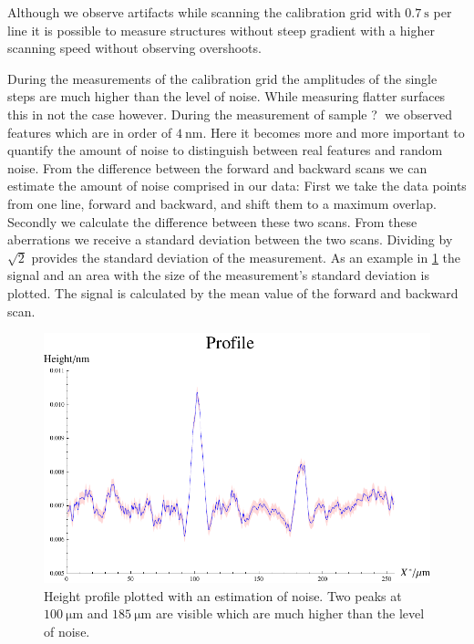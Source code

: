 \documentclass[paper=a4,fontsize=10pt,DIV=18,twocolumn,parskip=half]{scrartcl}
\numberwithin{equation}{section}    %
\begin{document}
Although we observe artifacts while scanning the calibration grid with  $\SI{0.7}{\second}$ per line it is possible to measure structures without steep gradient with a higher scanning speed without observing overshoots.

During the measurements of the calibration grid the amplitudes of the single steps are much higher than the level of noise. While measuring flatter surfaces this in not the case however. During the measurement of sample \textcircled{?} we observed features which are in order of $\SI{4}{\nano\meter}$.  Here it becomes more and more important to quantify the amount of noise to distinguish between real features and random noise.
From the difference between the forward and backward scans we can estimate the amount of noise comprised in our data: First we take the data points from one line, forward and backward, and shift them to a maximum overlap. Secondly we calculate the difference between these two scans. From these aberrations we receive a standard deviation between the two scans. Dividing by $\sqrt{2}$  provides the standard deviation of the measurement.
As an example in \cref{noise} the signal and an area with the size of the measurement's standard deviation is plotted. The signal is calculated by the mean value of the forward and backward scan.

\begin{figure}[htp]
	\begin{center}
		\includegraphics[width=\columnwidth]{Bilder/sn_signal2}
		\caption{Height profile plotted with an estimation of noise. Two peaks at $\SI{100}{\micro\meter}$ and $\SI{185}{\micro\meter}$ are visible which are much higher than the level of noise. }
		\label{noise}
	\end{center}
\end{figure}
\end{document}
